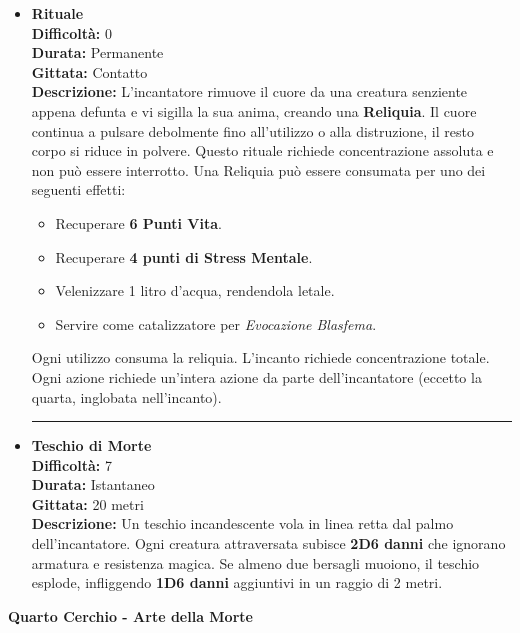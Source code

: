 \documentclass[./magie.tex]{subfiles}
\begin{document}
\begin{itemize}
\vspace{0.5cm}\rule{\textwidth}{0.4pt}\vspace{1cm}
\clearpage
\item \textbf{Rituale} \\
\textbf{Difficoltà:} 0 \\
\textbf{Durata:} Permanente \\
\textbf{Gittata:} Contatto \\
\textbf{Descrizione:} L’incantatore rimuove il cuore da una creatura senziente appena defunta e vi sigilla la sua anima, creando una \textbf{Reliquia}. Il cuore continua a pulsare debolmente fino all’utilizzo o alla distruzione, il resto corpo si riduce in polvere. Questo rituale richiede concentrazione assoluta e non può essere interrotto. Una Reliquia può essere consumata per uno dei seguenti effetti:
\begin{itemize}
  \item Recuperare \textbf{6 Punti Vita}.
  \item Recuperare \textbf{4 punti di Stress Mentale}.
  \item Velenizzare 1 litro d'acqua, rendendola letale.
  \item Servire come catalizzatore per \emph{Evocazione Blasfema}.
\end{itemize}
Ogni utilizzo consuma la reliquia. L'incanto richiede concentrazione totale.
Ogni azione richiede un’intera azione da parte dell’incantatore (eccetto la quarta, inglobata nell’incanto).

\vspace{0.5cm}\rule{\textwidth}{0.4pt}\vspace{1cm}

\item \textbf{Teschio di Morte} \\
\textbf{Difficoltà:} 7 \\
\textbf{Durata:} Istantaneo \\
\textbf{Gittata:} 20 metri \\
\textbf{Descrizione:} Un teschio incandescente vola in linea retta dal palmo dell'incantatore. Ogni creatura attraversata subisce \textbf{2D6 danni} che ignorano armatura e resistenza magica. Se almeno due bersagli muoiono, il teschio esplode, infliggendo \textbf{1D6 danni} aggiuntivi in un raggio di 2 metri.

\end{itemize}

\clearpage
\vspace{0.2cm}
{\zarafirtitlefont\Large\bfseries Quarto Cerchio - Arte della Morte}
\end{document}
